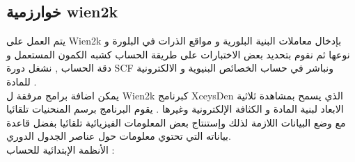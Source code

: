 \subsection{ خوارزمية wien2k }

يتم العمل على Wien2k بإدخال معاملات البنية البلورية و مواقع الذرات في البلورة و نوعها ثم  نقوم بتحديد بعض الاختبارات على طريقة الحساب كشبه الكمون المستعمل و دقة الحساب , نشغل دورة SCF ونباشر في حساب الخصائص 
البنيوية و الالكترونية للمادة .\\
يمكن اضافة برامج مرفقة ل Wien2k كبرنامج  XceysDen  الذي يسمح بمشاهدة ثلاثية الابعاد لبنية المادة و الكثافة الإلكترونية وغيرها .
يقوم البرنامج برسم المنحنيات تلقائيا مع وضع البيانات اللازمة لذلك وإستنتاج بعض المعلومات الفيزيائية تلقائيا بفضل قاعدة بياناته التي تحتوي معلومات حول عناصر الجدول الدوري.\\
الأنظمة الإبتدائية للحساب : 
